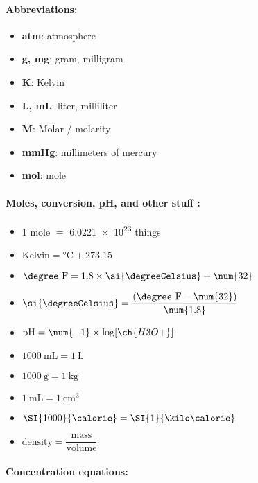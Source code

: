 \documentclass[9pt]{article}
\begin{document}
\begin{multicols}{2}
	\paragraph{\textsf{Abbreviations:}}
	\begin{itemize}
		\item \textbf{atm}: atmosphere
		\item \textbf{g, mg}: gram, milligram
		\item \textbf{K}: Kelvin
		\item \textbf{L, mL}: liter, milliliter
		\item \textbf{\textsc{M}}: Molar / molarity
		\item \textbf{mmHg}: millimeters of mercury
		\item \textbf{mol}: mole
	\end{itemize}
	\vspace{0.5cm}
	
	\paragraph{\textsf{Moles, conversion, pH, and other stuff : \newline}}
	
	\begin{itemize}
		\item 1 mole \( = \) \num{6.0221e23} things
		\item \( \textrm{Kelvin} = \si{\degreeCelsius} + \num{273.15} \)
		\item \( \textrm{\degree F} = 1.8 \times \si{\degreeCelsius} + \num{32} \)
		\item \( \si{\degreeCelsius} = \dfrac{(\textrm{\degree F} - \num{32})}{\num{1.8}} \)
		\item \( \textrm{pH} = \num{-1} \times  \log [\ch{H3O+}] \)
		\item \( \SI{1000}{\milli \liter} = \SI{1}{\liter} \)
		\item \( \SI{1000}{\gram} = \SI{1}{\kilo \gram} \)
		\item \( \SI{1}{\milli \liter} = \SI{1}{\centi \meter \cubed} \)
		\item \( \SI{1000}{\calorie} = \SI{1}{\kilo \calorie} \)
		\item \( \text{density} = \dfrac{\text{mass}}{\text{volume}}\)
	\end{itemize}
	\vspace{0.5cm}
	
	
	\paragraph{\textsf{Concentration equations:}}
	

\end{multicols}
\end{document}
